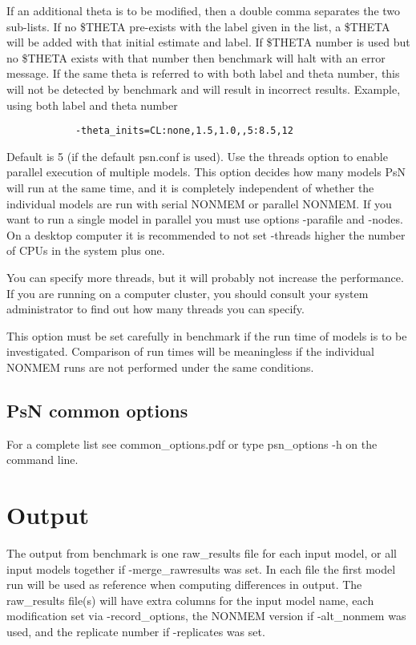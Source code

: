 \begin{optionlist}
			If an additional theta is to be modified, then a double comma separates 
			the two sub-lists. If no \$THETA pre-exists with the label given in the list,
			a \$THETA will be added with that initial estimate and label. 
			If \$THETA number is used but no \$THETA exists with that number then benchmark will halt with an
			error message.
			If the same theta is referred to with both label and theta number, this will not be detected
			by benchmark and will result in incorrect results.
			Example, using both label and theta number
			\begin{verbatim}
			-theta_inits=CL:none,1.5,1.0,,5:8.5,12
			\end{verbatim}
			\nextopt
			Default is 5 (if the default psn.conf is used). Use the threads option to enable parallel execution of multiple models. This option decides how many models PsN will run at the same time, and it is completely independent of whether the individual models are run with serial NONMEM or parallel NONMEM. If you want to run a single model in parallel you must use options -parafile and -nodes. On a desktop computer it is recommended to not set -threads higher the number of CPUs in the system plus one. 
			
			You can specify more threads, but it will probably not increase the performance. If you are running on a computer cluster, you should consult your system administrator to find out how many threads you can specify.
			
			This option must be set carefully in benchmark if the run time of models is to be investigated. Comparison of run times will be meaningless if the individual NONMEM runs are not performed under the same conditions. 
			\nextopt
						\end{optionlist}

\subsection{PsN common options}
For a complete list see common\_options.pdf or type psn\_options -h on the command line.

\section{Output}
The output from benchmark is
one raw\_results file for each input model, or all input models together if -merge\_rawresults was set.
In each file the first model run will be used as reference when computing differences in output.
The raw\_results file(s) will have extra columns for the input model name, each
modification set via -record\_options, the NONMEM version if -alt\_nonmem was used, and the replicate
number if -replicates was set.




